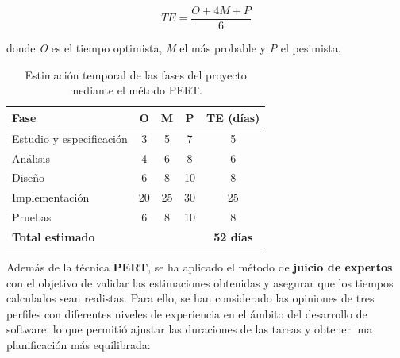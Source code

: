 \[
TE = \frac{O + 4M + P}{6}
\]

donde \textit{O} es el tiempo optimista, \textit{M} el más probable y \textit{P} el pesimista.


\begin{table}[H]
\centering
\begin{tabular}{|l|c|c|c|c|}
\hline
\textbf{Fase} & \textbf{O} & \textbf{M} & \textbf{P} & \textbf{TE (días)} \\
\hline
Estudio y especificación & 3 & 5 & 7 & 5 \\
Análisis & 4 & 6 & 8 & 6 \\
Diseño & 6 & 8 & 10 & 8 \\
Implementación & 20 & 25 & 30 & 25 \\
Pruebas & 6 & 8 & 10 & 8 \\
\hline
\textbf{Total estimado} &  &  &  & \textbf{52 días} \\
\hline
\end{tabular}
\caption{Estimación temporal de las fases del proyecto mediante el método PERT.}
\end{table}

Además de la técnica \textbf{PERT}, se ha aplicado el método de \textbf{juicio de expertos} con el objetivo de validar las estimaciones obtenidas y asegurar que los tiempos calculados sean realistas. 
Para ello, se han considerado las opiniones de tres perfiles con diferentes niveles de experiencia en el ámbito del desarrollo de software, lo que permitió ajustar las duraciones de las tareas y obtener una planificación más equilibrada:

